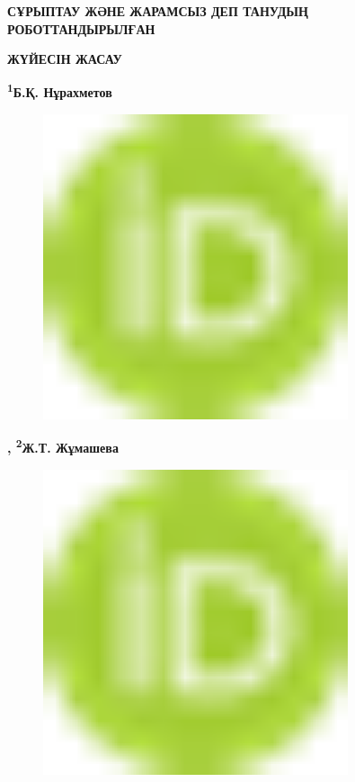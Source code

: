 
{\bfseries СҰРЫПТАУ ЖӘНЕ ЖАРАМСЫЗ ДЕП ТАНУДЫҢ РОБОТТАНДЫРЫЛҒАН}

{\bfseries ЖҮЙЕСІН ЖАСАУ}

{\bfseries \textsuperscript{1}Б.Қ. Нұрахметов}

\begin{figure}[H]
	\centering
	\includegraphics[width=0.8\textwidth]{media/ict2/image1}
	\caption*{}
\end{figure}
{\bfseries ,
\textsuperscript{2}Ж.Т. Жұмашева}

\begin{figure}[H]
	\centering
	\includegraphics[width=0.8\textwidth]{media/ict2/image1}
	\caption*{}
\end{figure}
{\bfseries \textsuperscript{\envelope }}

